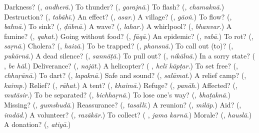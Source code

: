 \begin{tcolorbox}[breakable,colback=teal!4,colframe=teal!35!black,title={Before you move on}]
Darkness? (\textbf{}, \emph{andherā}.) To thunder? (\textbf{}, \emph{garajnā}.) To flash? (\textbf{}, \emph{chamaknā}.) Destruction? (\textbf{}, \emph{tabāhī}.) An effect? (\textbf{}, \emph{asar}.) A village? (\textbf{}, \emph{gāoṅ}.) To flow? (\textbf{}, \emph{bahnā}.) To sink? (\textbf{}, \emph{ḍūbnā}.) A wave? (\textbf{}, \emph{lahar}.) A whirlpool? (\textbf{}, \emph{bhanvar}.) A famine? (\textbf{}, \emph{qahat}.) Going without food? (\textbf{}, \emph{fāqā}.) An epidemic? (\textbf{}, \emph{vabā}.) To rot? (\textbf{}, \emph{saṛnā}.) Cholera? (\textbf{}, \emph{haizā}.) To be trapped? (\textbf{}, \emph{phansnā}.) To call out (to)? (\textbf{}, \emph{pukārnā}.) A dead silence? (\textbf{}, \emph{sannāṭā}.) To pull out? (\textbf{}, \emph{nikālnā}.) In a sorry state? (\textbf{ }, \emph{be hāl}.) Deliverance? (\textbf{}, \emph{najāt}.) A helicopter? (\textbf{ }, \emph{helī kāpṭar}.) To set free? (\textbf{}, \emph{chhuṛānā}.) To dart? (\textbf{}, \emph{lapaknā}.) Safe and sound? (\textbf{}, \emph{salāmat}.) A relief camp? (\textbf{}, \emph{kaimp}.) Relief? (\textbf{}, \emph{rāhat}.) A tent? (\textbf{}, \emph{khaimā}.) Refuge? (\textbf{}, \emph{panāh}.) Affected? (\textbf{}, \emph{mutāsir}.) To be separated? (\textbf{}, \emph{bichhaṛnā}.) To lose one's way? (\textbf{}, \emph{bhaṭaknā}.) Missing? (\textbf{}, \emph{gumshudā}.) Reassurance? (\textbf{}, \emph{tasallī}.) A reunion? (\textbf{}, \emph{milāp}.) Aid? (\textbf{}, \emph{imdād}.) A volunteer? (\textbf{}, \emph{razākār}.) To collect? (\textbf{ }, \emph{jama karnā}.) Morale? (\textbf{}, \emph{hauslā}.) A donation? (\textbf{}, \emph{atiyā}.)
\end{tcolorbox}
